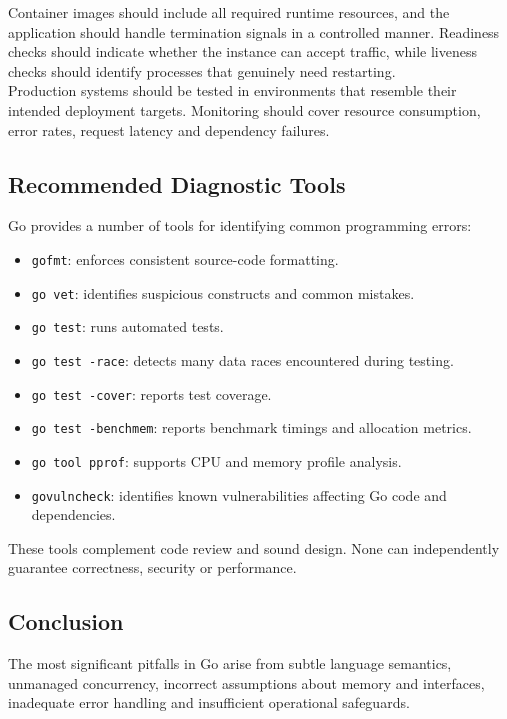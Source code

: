 Container images should include all required runtime resources, and the application should handle termination signals in a controlled manner. Readiness checks should indicate whether the instance can accept traffic, while liveness checks should identify processes that genuinely need restarting.\\

Production systems should be tested in environments that resemble their intended deployment targets. Monitoring should cover resource consumption, error rates, request latency and dependency failures.

\subsection{Recommended Diagnostic Tools}

Go provides a number of tools for identifying common programming errors:

\begin{itemize}
    \item \texttt{gofmt}: enforces consistent source-code formatting.
    \item \texttt{go vet}: identifies suspicious constructs and common mistakes.
    \item \texttt{go test}: runs automated tests.
    \item \texttt{go test -race}: detects many data races encountered during testing.
    \item \texttt{go test -cover}: reports test coverage.
    \item \texttt{go test -benchmem}: reports benchmark timings and allocation metrics.
    \item \texttt{go tool pprof}: supports CPU and memory profile analysis.
    \item \texttt{govulncheck}: identifies known vulnerabilities affecting Go code and dependencies.
\end{itemize}

These tools complement code review and sound design. None can independently guarantee correctness, security or performance.

\subsection{Conclusion}

The most significant pitfalls in Go arise from subtle language semantics, unmanaged concurrency, incorrect assumptions about memory and interfaces, inadequate error handling and insufficient operational safeguards.\\

